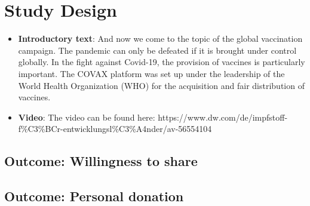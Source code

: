 \documentclass[12pt,oneside,smallheadings,chapterprefix=true]{article}
\begin{document}




\clearpage
\setcounter{page}{1}

\begin{center}
\end{center}






\tableofcontents


\clearpage
\section{Study Design}


\begin{itemize}
\item
  \textbf{Introductory text}: And now we come to the topic of the global
  vaccination campaign. The pandemic can only be defeated if it is
  brought under control globally. In the fight against Covid-19, the
  provision of vaccines is particularly important. The COVAX platform
  was set up under the leadership of the World Health Organization (WHO)
  for the acquisition and fair distribution of vaccines.
\item
  \textbf{Video}: The video can be found here:
  https://www.dw.com/de/impfstoff-f\%C3\%BCr-entwicklungsl\%C3\%A4nder/av-56554104
\end{itemize}

\subsection{Outcome: Willingness to share}


\hypertarget{outcome-personal-donation}{%
\subsection{Outcome: Personal
donation}\label{outcome-personal-donation}}
\end{document}
